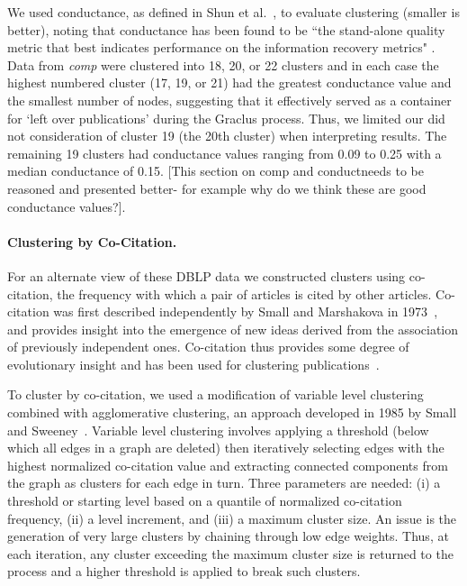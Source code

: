 We used conductance, as defined in Shun et al.~\cite{shun_parallel_2016}, to  evaluate clustering (smaller is better), noting that
conductance has been found to be ``the stand-alone quality metric that best indicates performance on the information recovery metrics" \cite{emmons2016analysis}. Data from \emph{comp} were clustered into 18, 20, or 22 clusters and in each case the highest numbered cluster (17, 19, or 21) had the greatest conductance value and the smallest number of nodes, suggesting that it effectively served as a container for `left over publications' during the Graclus process. Thus, we limited our did not consideration of cluster 19 (the 20th cluster) when interpreting results.  The remaining 19 clusters had conductance values ranging from 0.09 to 0.25 with a median conductance of 0.15. [This section on comp and conductneeds to be reasoned and presented better- for example why do we think these are good conductance values?].

\paragraph{Clustering by Co-Citation.}
For an alternate view of these DBLP data we constructed clusters using co-citation, the frequency with which a pair of articles is cited by other articles. Co-citation was first described independently by Small and Marshakova in 1973~\cite{small_co-citation_1973,marshakova-shaikevich_co-citation_1973}, and provides insight into the emergence of new ideas derived from the association of previously independent ones.  Co-citation thus provides some degree of evolutionary insight and has been used for clustering publications~\cite{boyack_cocitation_2010,boyack_improving_2013,small_structure_1974,small_clustering_1985}. 

To cluster by co-citation, we used a modification of variable level clustering combined with agglomerative clustering, an approach developed in 1985 by Small and Sweeney~\cite{small_clustering_1985}. Variable level clustering involves applying a threshold (below which all edges in a graph are deleted) then iteratively selecting edges with the highest normalized co-citation value and extracting connected components from the graph as clusters for each edge in turn. Three parameters are needed: (i) a threshold or starting level based on a quantile of normalized co-citation frequency, (ii) a level increment, and (iii) a maximum cluster size. An issue is the generation of very large clusters by chaining through low edge weights.  Thus, at each iteration, any cluster exceeding the maximum cluster size  is returned to the process and a higher threshold is applied to break such clusters.

